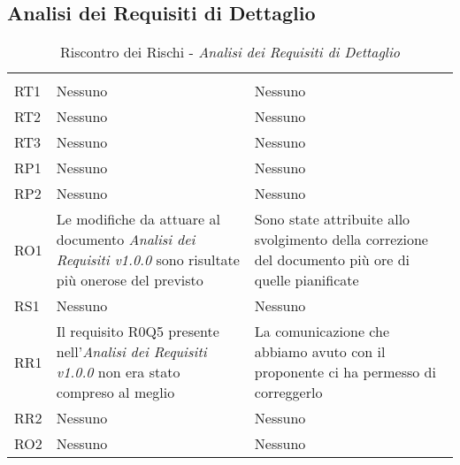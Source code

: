 \subsection{Analisi dei Requisiti di Dettaglio}
\begin{table}[H]
	\centering
	\begin{tabular}{|C{2.5cm}|C{5cm}|C{5cm}|}
		 & & \\
		RT1  & Nessuno & Nessuno \\
		\hline
		RT2  & Nessuno & Nessuno \\
		\hline
		RT3  & Nessuno & Nessuno \\
		\hline
		RP1  & Nessuno & Nessuno \\
		\hline
		RP2  & Nessuno & Nessuno \\
		\hline
		RO1  & Le modifiche da attuare al documento \textit{Analisi dei Requisiti v1.0.0} sono risultate più onerose del previsto & Sono state attribuite allo svolgimento della correzione del documento più ore di quelle pianificate \\
		\hline
		RS1  & Nessuno & Nessuno \\
		\hline
		RR1  & Il requisito R0Q5 presente nell'\textit{Analisi dei Requisiti v1.0.0} non era stato compreso al meglio  & La comunicazione che abbiamo avuto con il proponente ci ha permesso di correggerlo \\
		\hline
		RR2  & Nessuno & Nessuno \\
		\hline
		RO2  & Nessuno & Nessuno \\
		\hline
	\end{tabular}
	\caption{Riscontro dei Rischi - \textit{Analisi dei Requisiti di Dettaglio}}
\end{table}

